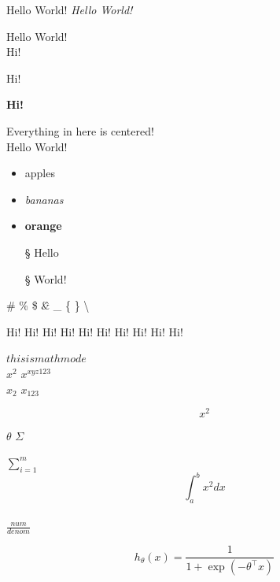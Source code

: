 \documentclass{article}
\begin{document}
\Huge Hello World!
\textit{Hello World!}

\noindent Hello World!\\
Hi!

\indent Hi!

\textbf{Hi!}

\begin{center}
Everything in here is centered!\\
Hello World!
\end{center}

\begin{itemize}
\item apples
\item \textit{bananas}
\item \textbf{orange}
\end{itemize}

\begin{itemize}
\item[\S] Hello
\item[\S] World!
\end{itemize}

\# \% \$ \^  \& \_ \{ \} \textbackslash{} 


\tiny Hi!
\scriptsize Hi!
\footnotesize Hi!
\small Hi!
\normalsize Hi!
\large Hi!
\Large Hi!
\LARGE Hi!
\huge Hi!
\Huge Hi!


$this is math mode$\\
$x^2$
$x^{xyz123}$\\

$x_2$
$x_{123}$

$$x^2$$

$\theta$
$\Sigma$

\huge
$\sum_{i = 1}^m$\\
$$\int_{a}^{b} x^2 dx$$\\

$\frac{num}{denom}$

$$ h_\theta(x) = \frac{1}{1 + \exp(-\theta^\top x)}$$
\end{document}
